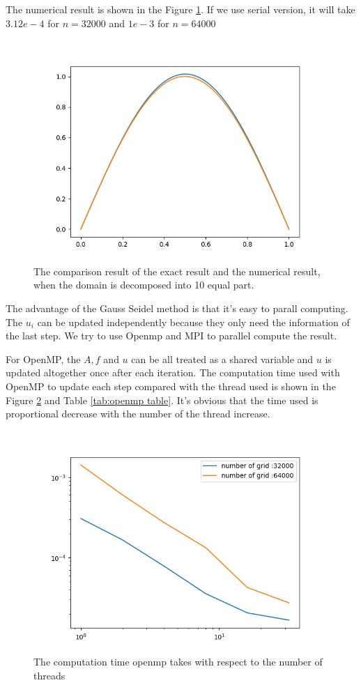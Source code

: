 \documentclass[11pt]{article}
\begin{document}
The numerical result is shown in the Figure \ref{fig:result comparison}. If we use serial version, it will take $3.12e-4$ for $n=32000$ and $1e-3$ for $n = 64000$ 
\begin{figure}
    \centering
    \includegraphics[width = 0.5\linewidth]{../CPP_code/1D_problem/openmp_version_gauss_seidel/result.png}
    \caption{The comparison result of the exact result and the numerical result, when the domain is decomposed into 10 equal part.}
    \label{fig:result comparison}
\end{figure}


The advantage of the Gauss Seidel method is that it's easy to parall computing. The $u_i$ can be updated independently because they only need the information of the last step. We try to use Openmp and MPI to parallel compute the result.  

For OpenMP, the $A,f$ and $u$ can be all treated as a shared variable and $u$ is updated altogether once after each iteration.
The computation time used with OpenMP to update each step compared with the thread used is shown in the Figure \ref{fig:openmp result} and Table \ref{tab:openmp table}. It's obvious that the time used is proportional decrease with the number of the thread increase.
\begin{figure}
    \centering
    \includegraphics[width = 0.5\linewidth]{../CPP_code/1D_problem/openmp_version_gauss_seidel/open_mp_result.png}
    \caption{The computation time openmp takes with respect to the number of threads}
    \label{fig:openmp result}
\end{figure}
\end{document}
